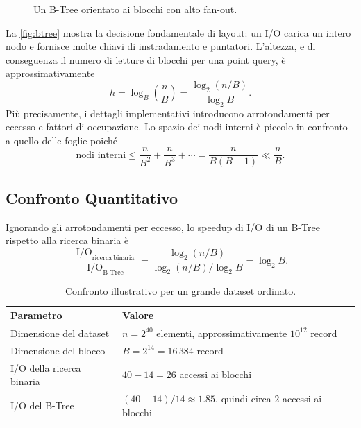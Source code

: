\begin{figure}[H]
  \centering
  \caption{Un B-Tree orientato ai blocchi con alto fan-out.}
  \label{fig:btree}
\end{figure}

La \autoref{fig:btree} mostra la decisione fondamentale di layout: un I/O carica un intero nodo e fornisce molte chiavi di instradamento e puntatori. L'altezza, e di conseguenza il numero di letture di blocchi per una point query, è approssimativamente
\[
  h = \log_B\!\left(\frac{n}{B}\right)
    = \frac{\log_2(n/B)}{\log_2 B}.
\]
Più precisamente, i dettagli implementativi introducono arrotondamenti per eccesso e fattori di occupazione. Lo spazio dei nodi interni è piccolo in confronto a quello delle foglie poiché
\[
  \text{nodi interni}
  \leq \frac{n}{B^2}+\frac{n}{B^3}+\cdots
  = \frac{n}{B(B-1)}
  \ll \frac{n}{B}.
\]

\subsection{Confronto Quantitativo}
\label{subsec:btree-comparison}

Ignorando gli arrotondamenti per eccesso, lo speedup di I/O di un B-Tree rispetto alla ricerca binaria è
\[
  \frac{\operatorname{I/O}_{\mathrm{ricerca\ binaria}}}
       {\operatorname{I/O}_{\mathrm{B\text{-}Tree}}}
  = \frac{\log_2(n/B)}{\log_2(n/B)/\log_2 B}
  = \log_2 B.
\]

\begin{table}[H]
  \centering
  \caption{Confronto illustrativo per un grande dataset ordinato.}
  \label{tab:btree-example}
  \begin{tabularx}{\textwidth}{@{}lX@{}}
    \toprule
    Parametro & Valore \\
    \midrule
    Dimensione del dataset & $n=2^{40}$ elementi, approssimativamente $10^{12}$ record \\
    Dimensione del blocco & $B=2^{14}=16\,384$ record \\
    I/O della ricerca binaria & $40-14=26$ accessi ai blocchi \\
    I/O del B-Tree & $(40-14)/14\approx1.85$, quindi circa $2$ accessi ai blocchi \\
    \bottomrule
  \end{tabularx}
\end{table}

